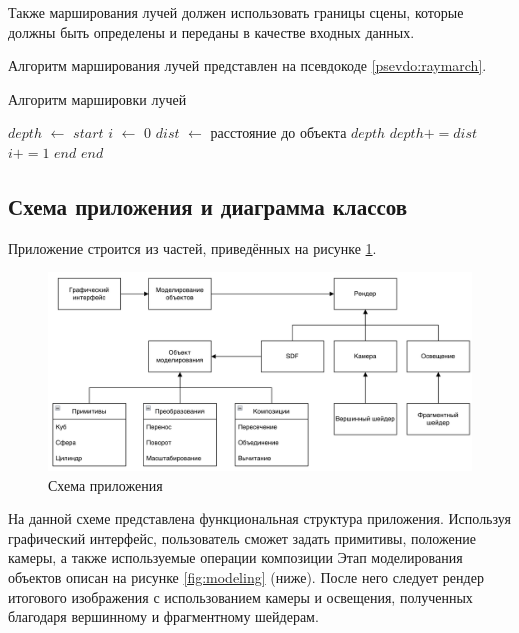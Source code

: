 Также  марширования лучей  должен  использовать  границы  сцены, 
которые  должны  быть  определены  и  переданы  в  качестве  входных  данных.

Алгоритм марширования лучей представлен на псевдокоде \ref{psevdo:raymarch}.
\begin{algorithm}
	\caption{Алгоритм маршировки лучей}\label{psevdo:raymarch}
	\begin{algorithmic}[1]
		\State $depth$ $\leftarrow$ $start$
		\State $i$ $\leftarrow$ $0$
		\State $dist$ $\leftarrow$ расстояние до объекта
		\State \Return $depth$
		\EndIf
		\State $depth += dist$
		\State $i += 1$
		\State \Return $end$
		\EndIf
		\EndWhile
		\State \Return $end$
		\EndFunction
	\end{algorithmic}
\end{algorithm}

\subsection{Схема приложения и диаграмма классов}

Приложение строится из частей, приведённых на рисунке \ref{fig:app}.
\clearpage

\begin{figure}[h]
	\centering
	\includegraphics[width=160mm]{img/app.png}
	\caption{Схема приложения}
	\label{fig:app}
\end{figure}

На  данной  схеме  представлена  функциональная  структура  приложения.
Используя  графический  интерфейс,  пользователь  сможет  задать  примитивы, 
положение  камеры,  а  также  используемые  операции  композиции
Этап моделирования  объектов  описан  на  рисунке  \ref{fig:modeling} (ниже).
После  него  следует рендер  итогового  изображения  с  использованием  камеры  и  освещения, полученных благодаря вершинному и фрагментному шейдерам.

